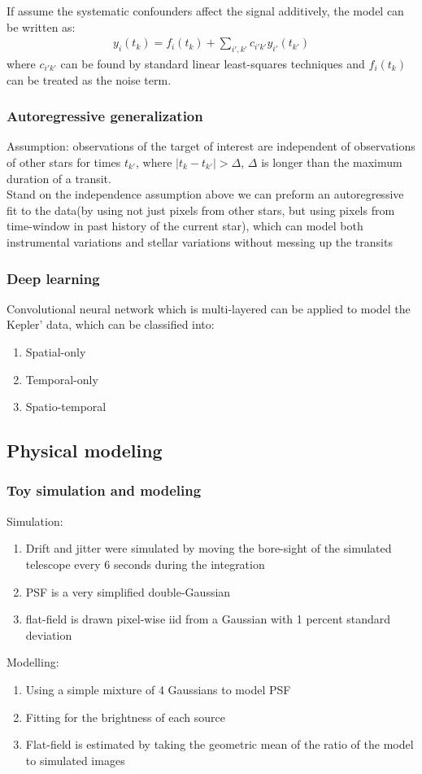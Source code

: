 \documentclass[]{article}
\begin{document}
If assume the systematic confounders affect the signal additively, the model can be written as:
\begin{align*}
y_{i}(t_{k})=f_{i}(t_{k})+ \sum_{i',k'} c_{i'k'}y_{i'}(t_{k'})
\end{align*}
where $ c_{i'k'}$ can be found by standard linear least-squares techniques and $f_{i}(t_{k})$ can be treated as the noise term.

\subsubsection{Autoregressive generalization}
Assumption: observations of the target of interest are independent of observations of other stars for times $t_{k'}$, where $\mid t_{k}-t_{k'} \mid > \Delta$, $\Delta$ is longer than the maximum duration of a transit.\\
Stand on the independence assumption above we can preform an autoregressive fit to the data(by using not just pixels from other stars, but using pixels from time-window in past history of the current star), which can model both instrumental variations and stellar variations without messing up the transits

\subsubsection{Deep learning}
Convolutional neural network which is multi-layered can be applied to model the Kepler' data, which can be classified into:
\begin{enumerate}
 \item Spatial-only
 \item Temporal-only 
 \item Spatio-temporal
\end{enumerate}

\subsection{Physical modeling}

\subsubsection{Toy simulation and modeling}
Simulation:
\begin{enumerate}
 \item Drift and jitter were simulated by moving the bore-sight of the simulated telescope every 6 seconds during the integration
 \item PSF is a very simplified double-Gaussian
 \item flat-field is drawn pixel-wise iid from a Gaussian with 1 percent standard deviation
\end{enumerate} 
Modelling:
\begin{enumerate}
 \item Using a simple mixture of 4 Gaussians to model PSF
 \item Fitting for the brightness of each source 
 \item Flat-field is estimated by taking the geometric mean of the ratio of the model to simulated images
\end{enumerate} 
\end{document}
